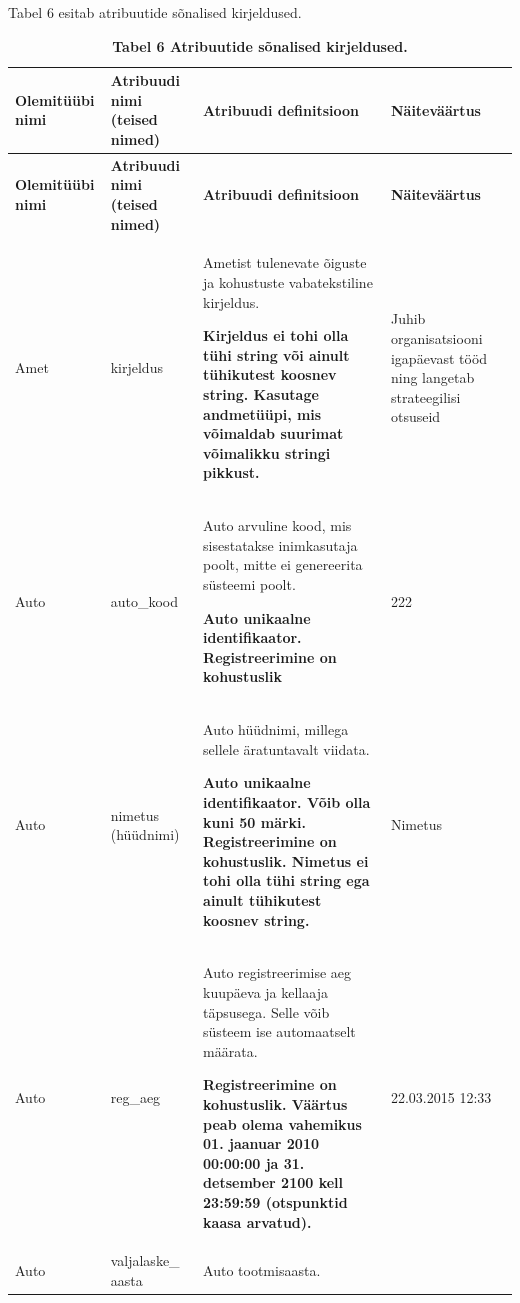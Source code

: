 Tabel 6 esitab atribuutide sõnalised kirjeldused.

\begin{longtabu} to \textwidth {| X | X | X[2] | X |} 
	\caption{\textbf{Tabel 6 Atribuutide sõnalised kirjeldused.}} \\
	\hline
	\textbf{Olemitüübi nimi}   &   \textbf{Atribuudi nimi (teised nimed)} & \textbf{Atribuudi definitsioon}  & \textbf{Näiteväärtus} \\
	\hline
	\endfirsthead
	\hline
	\textbf{Olemitüübi nimi}   &   \textbf{Atribuudi nimi (teised nimed)} & \textbf{Atribuudi definitsioon}  & \textbf{Näiteväärtus} \\
	\hline
	\endhead

	Amet
	& kirjeldus
	& Ametist tulenevate õiguste ja kohustuste vabatekstiline kirjeldus.
	
	\textbf{Kirjeldus ei tohi olla tühi string või ainult tühikutest koosnev string. Kasutage andmetüüpi, mis võimaldab suurimat võimalikku stringi pikkust.}
	& Juhib organisatsiooni igapäevast tööd ning langetab strateegilisi otsuseid 
	 \\ \hline
	
	Auto
	& auto\_kood
	& Auto arvuline kood, mis sisestatakse inimkasutaja poolt, mitte ei genereerita süsteemi poolt. 
	
	\textbf{Auto unikaalne identifikaator. Registreerimine on kohustuslik}
	& 222
	\\ \hline
	
   	Auto
	& nimetus (hüüdnimi)
	& Auto hüüdnimi, millega sellele äratuntavalt viidata.
	
	\textbf{Auto unikaalne identifikaator. Võib olla kuni 50 märki. Registreerimine on kohustuslik. Nimetus ei tohi olla tühi string ega ainult tühikutest koosnev string.}
	& Nimetus\\ \hline
	
   	Auto
	& reg\_aeg
	& Auto registreerimise aeg kuupäeva ja kellaaja täpsusega. Selle võib süsteem ise automaatselt määrata.
	
	\textbf{Registreerimine on kohustuslik. Väärtus peab olema vahemikus 01. jaanuar 2010 00:00:00 ja 31. detsember 2100 kell 23:59:59 (otspunktid kaasa arvatud).}
	
	& 22.03.2015 12:33\\ \hline
	
   	Auto
	& valjalaske\_
	aasta
	& Auto tootmisaasta.
	

\end{longtabu}
